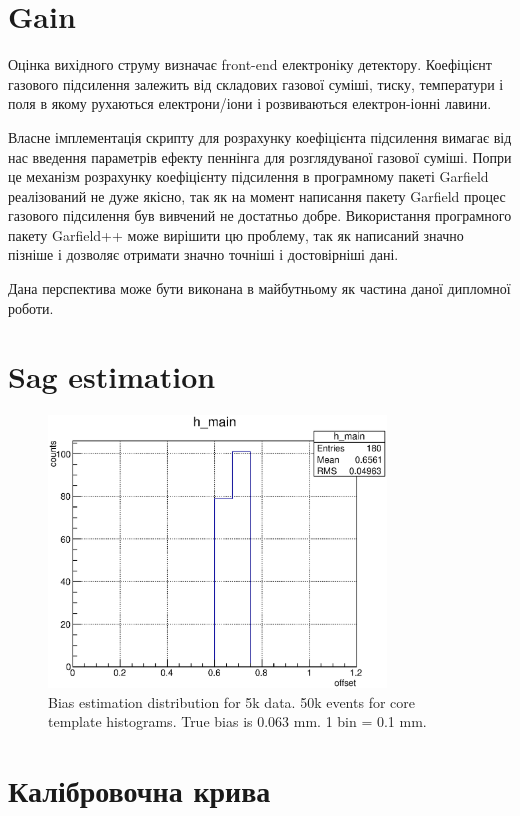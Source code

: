 \documentclass[]{article}
\begin{document}
	
	\section{Gain}
	Оцінка вихідного струму визначає front-end електроніку детектору. Коефіцієнт газового підсилення залежить від складових газової суміші, тиску, температури і поля в якому рухаються електрони/іони і розвиваються електрон-іонні лавини.
	
	Власне імплементація скрипту для розрахунку коефіцієнта підсилення вимагає від нас введення параметрів ефекту пеннінга \cite{} для розглядуваної газової суміші. Попри це механізм розрахунку коефіцієнту підсилення в програмному пакеті Garfield реалізований не дуже якісно, так як на момент написання пакету Garfield процес газового підсилення був вивчений не достатньо добре. Використання програмного пакету Garfield++ може вирішити цю проблему, так як написаний значно пізніше і дозволяє отримати значно точніші і достовірніші дані.
	
	Дана перспектива може бути виконана в майбутньому як частина даної дипломної роботи.
	
	
	\section{ Sag estimation}
	
	\begin{figure}[h]
	\includegraphics[width=0.8\textwidth]{chi_063_5k.eps}
	\centering
	\caption{ Bias estimation distribution for 5k data. 50k events for core template histograms. True bias is 0.063 mm. 1 bin = 0.1 mm. } 
	\label{fig:chi_063_5k}
	\end{figure}
	
	
	\section{Калібровочна крива}
	
\end{document}
